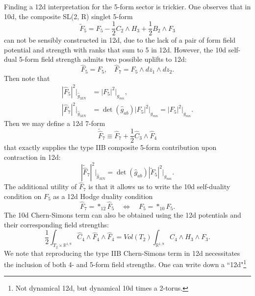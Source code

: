 Finding a 12d interpretation for the 5-form sector is trickier. 
One observes that in 10d, the composite SL(2, R) singlet 5-form 
\begin{equation}
\tilde F_5 = F_5 - \frac12 C_2 \wedge H_3 + \frac{1}{2}B_2\wedge F_3    
\end{equation}
can not be sensibly constructed in 12d, due to the lack of a pair of form field potential and strength with ranks that sum to 5 in 12d.
However, the 10d self-dual 5-form field strength admits two possible uplifts to 12d:
\begin{equation}
\hat{F}_5 = F_5,\quad \hat{F}_7=F_5\wedge dz_1 \wedge dz_2.
\end{equation}
Then note that
\begin{equation}
\begin{aligned}
|\hat{F}_5|^2\bigg|_{\hat{g}_{MN}} 
&= |F_5|^2\bigg|_{g_{mn}},\\
|\hat{F}_7|^2\bigg|_{\hat{g}_{MN}}
&=\det(\hat{g}_{ab})|F_5|^2\bigg|_{g_{mn}} = |F_5|^2\bigg|_{g_{mn}}.
\end{aligned}
\end{equation}
Then we may define a 12d 7-form
\begin{equation}
\tilde{\hat{F}}_7 \equiv \hat{F}_7 + \frac{1}{2}\hat{C}_3 \wedge \hat{F}_4
\end{equation}
that exactly supplies the type IIB composite 5-form contribution upon contraction in 12d:
\begin{equation}
|\tilde{\hat{F}}_7|^2\bigg|_{\hat{g}_{MN}} = 
\det(\hat{g}_{ab})|\tilde F_5|^2\bigg|_{g_{mn}}.
\end{equation}
The additional utility of $\hat{F}_7$ is that it allows us to write the 10d self-duality condition on $F_5$ as a 12d Hodge duality condition
\begin{equation}
\hat{F}_7 = *_{12}\hat{F}_5\quad
\Leftrightarrow\quad
F_5 = *_{10}F_5.
\label{12d interpretation of 10d self-duality}
\end{equation}
The 10d Chern-Simons term can also be obtained using the 12d potentials and their corresponding field strengths:
\begin{equation}
\frac{1}{2}\int_{T_2\times \mathbb{R}^{1,9}} \hat{C}_4\wedge \hat{F}_4\wedge\hat{F}_4=
Vol(T_2)\int_{\mathbb{R}^{1,9}}C_4\wedge H_3\wedge F_3.
\end{equation}
We note that reproducing the type IIB Chern-Simons term in 12d necessitates the inclusion of both 4- and 5-form field strengths.
One can write down a ``12d"\footnote{
Not dynamical 12d, but dynamical 10d times a 2-torus.
}
